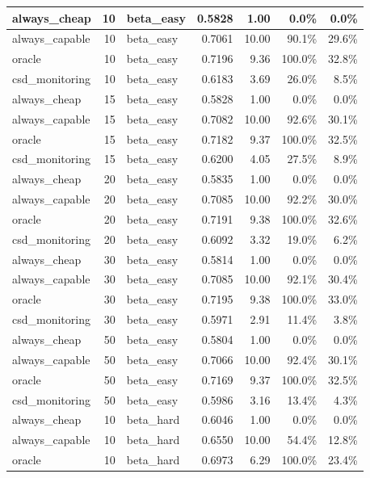 \documentclass[11pt]{article}
\begin{document}
\begin{table}[h]
\begin{tabular}{l|r|l|r|r|r|r}
always\_cheap & 10 & beta\_easy & 0.5828 & 1.00 & 0.0\% & 0.0\% \\
\midrule
always\_capable & 10 & beta\_easy & 0.7061 & 10.00 & 90.1\% & 29.6\% \\
\midrule
oracle & 10 & beta\_easy & 0.7196 & 9.36 & 100.0\% & 32.8\% \\
\midrule
csd\_monitoring & 10 & beta\_easy & 0.6183 & 3.69 & 26.0\% & 8.5\% \\
\midrule
always\_cheap & 15 & beta\_easy & 0.5828 & 1.00 & 0.0\% & 0.0\% \\
\midrule
always\_capable & 15 & beta\_easy & 0.7082 & 10.00 & 92.6\% & 30.1\% \\
\midrule
oracle & 15 & beta\_easy & 0.7182 & 9.37 & 100.0\% & 32.5\% \\
\midrule
csd\_monitoring & 15 & beta\_easy & 0.6200 & 4.05 & 27.5\% & 8.9\% \\
\midrule
always\_cheap & 20 & beta\_easy & 0.5835 & 1.00 & 0.0\% & 0.0\% \\
\midrule
always\_capable & 20 & beta\_easy & 0.7085 & 10.00 & 92.2\% & 30.0\% \\
\midrule
oracle & 20 & beta\_easy & 0.7191 & 9.38 & 100.0\% & 32.6\% \\
\midrule
csd\_monitoring & 20 & beta\_easy & 0.6092 & 3.32 & 19.0\% & 6.2\% \\
\midrule
always\_cheap & 30 & beta\_easy & 0.5814 & 1.00 & 0.0\% & 0.0\% \\
\midrule
always\_capable & 30 & beta\_easy & 0.7085 & 10.00 & 92.1\% & 30.4\% \\
\midrule
oracle & 30 & beta\_easy & 0.7195 & 9.38 & 100.0\% & 33.0\% \\
\midrule
csd\_monitoring & 30 & beta\_easy & 0.5971 & 2.91 & 11.4\% & 3.8\% \\
\midrule
always\_cheap & 50 & beta\_easy & 0.5804 & 1.00 & 0.0\% & 0.0\% \\
\midrule
always\_capable & 50 & beta\_easy & 0.7066 & 10.00 & 92.4\% & 30.1\% \\
\midrule
oracle & 50 & beta\_easy & 0.7169 & 9.37 & 100.0\% & 32.5\% \\
\midrule
csd\_monitoring & 50 & beta\_easy & 0.5986 & 3.16 & 13.4\% & 4.3\% \\
\midrule
always\_cheap & 10 & beta\_hard & 0.6046 & 1.00 & 0.0\% & 0.0\% \\
\midrule
always\_capable & 10 & beta\_hard & 0.6550 & 10.00 & 54.4\% & 12.8\% \\
\midrule
oracle & 10 & beta\_hard & 0.6973 & 6.29 & 100.0\% & 23.4\% \\

\end{tabular}
\end{table}
\end{document}
